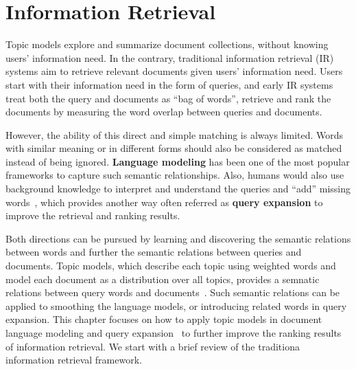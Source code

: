 \chapter{Information Retrieval}
\label{ch:ir}

Topic models explore and summarize document collections, without knowing users' information need. In the contrary, traditional information retrieval (IR) systems aim to retrieve relevant documents given users' information need. Users start with their information need in the form of queries, and early IR systems treat both the query and documents as ``bag of words'', retrieve and rank the documents by measuring the word overlap between queries and documents.


However, the ability of this direct and simple matching is always limited. Words with similar meaning or in different forms should also be considered as matched instead of being ignored. \textbf{Language modeling} has been one of the most popular frameworks to capture such semantic relationships. Also, humans would also use background knowledge to interpret and understand the queries and ``add'' missing words~\citep{wei-07}, which provides another way often referred as \textbf{query expansion} to improve the retrieval and ranking results.

Both directions can be pursued by learning and discovering the semantic relations between words and further the semantic relations between queries and documents. Topic models, which describe each topic using weighted words and model each document as a distribution over all topics, provides a semnatic relations between query words and documents~\citep{deerwester-90,hofmann-99a}. Such semantic relations can be applied to smoothing the language models, or introducing related words in query expansion. This chapter focuses on how to apply topic models in document language modeling \citep{Lu-2011,wei-06} and query expansion~\citep{Park-2009,Andrzejewski-2011} to further improve the ranking results of information retrieval. We start with a brief review of the traditiona information retrieval framework.

